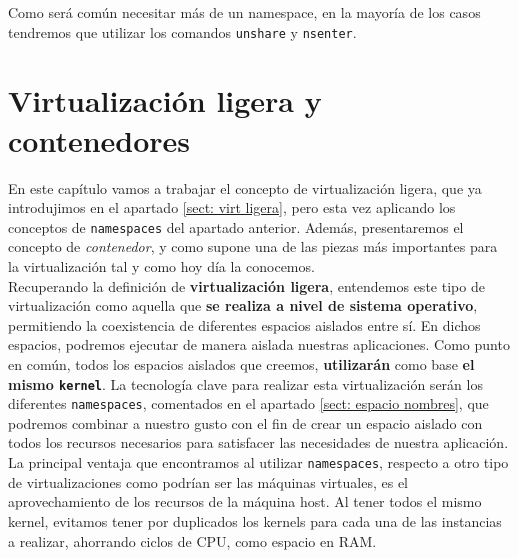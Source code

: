\documentclass[12pt]{article}
\begin{document}
	\noindent Como será común necesitar más de un namespace, en la mayoría de los casos tendremos que utilizar los comandos \texttt{unshare} y \texttt{nsenter}.

	\pagebreak
	
	\section{Virtualización ligera y contenedores}
	\label{sec: virt ligera y contenedores}
	
	\noindent En este capítulo vamos a trabajar el concepto de virtualización ligera, que ya introdujimos en el apartado \ref{sect: virt ligera}, pero esta vez aplicando los conceptos de \texttt{namespaces} del apartado anterior. Además, presentaremos el concepto de \textit{contenedor}, y como supone una de las piezas más importantes para la virtualización tal y como hoy día la conocemos. \\
	
	\noindent Recuperando la definición de \textbf{virtualización ligera}, entendemos este tipo de virtualización como aquella que \textbf{se realiza a nivel de sistema operativo}, permitiendo la coexistencia de diferentes espacios aislados entre sí. En dichos espacios, podremos ejecutar de manera aislada nuestras aplicaciones. Como punto en común, todos los espacios aislados que creemos, \textbf{utilizarán} como base \textbf{el mismo \texttt{kernel}}. La tecnología clave para realizar esta virtualización serán los diferentes \texttt{namespaces}, comentados en el apartado \ref{sect: espacio nombres}, que podremos combinar a nuestro gusto con el fin de crear un espacio aislado con todos los recursos necesarios para satisfacer las necesidades de nuestra aplicación. \\
	
	\noindent La principal ventaja que encontramos al utilizar \texttt{namespaces}, respecto a otro tipo de virtualizaciones como podrían ser las máquinas virtuales, es el aprovechamiento de los recursos de la máquina host. Al tener todos el mismo kernel, evitamos tener por duplicados los kernels para cada una de las instancias a realizar, ahorrando ciclos de CPU, como espacio en RAM.\\
	
\end{document}

